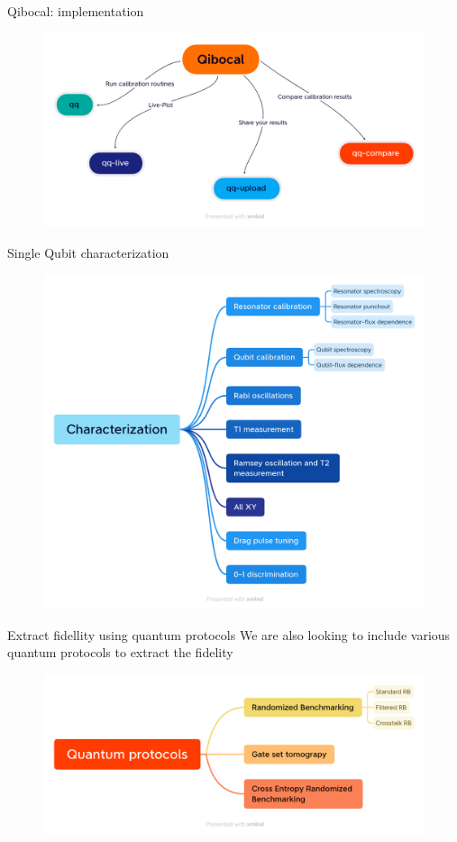 \documentclass[11p,aspectratio=169]{beamer}
\begin{document}
\begin{frame}{Qibocal: implementation}
    \begin{figure}
        \includegraphics[width= \textwidth]{figures/Qibocal.png}
    \end{figure}
\end{frame}

\begin{frame}{Single Qubit characterization}
    \begin{figure}
        \includegraphics[width= 0.8 \textwidth]{figures/Characterization.png}
    \end{figure}
\end{frame}

\begin{frame}{Extract fidellity using quantum protocols}
    We are also looking to include various quantum protocols to extract the fidelity
    \begin{figure}
        \includegraphics[width= 0.8 \textwidth]{figures/Quantum protocols.png}
    \end{figure}
\end{frame}
\end{document}

